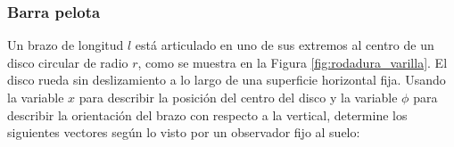 \subsubsection{Barra pelota}
Un brazo de longitud \( l \) está articulado en uno de sus extremos al centro de un disco circular de radio \( r \), como se muestra en la Figura \ref{fig:rodadura_varilla}. El disco rueda sin deslizamiento a lo largo de una superficie horizontal fija. Usando la variable \( x \) para describir la posición del centro del disco y la variable \( \phi \) para describir la orientación del brazo con respecto a la vertical, determine los siguientes vectores según lo visto por un observador fijo al suelo:


